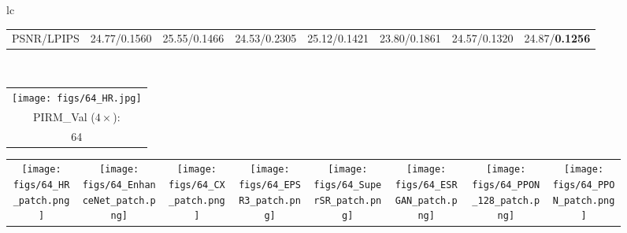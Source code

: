 \documentclass[preprint]{elsarticle}
\begin{document}
\begin{figure*}[htpb]
{\begin{tabular}{lc}
\begin{adjustbox}{valign=t}
\begin{tabular}{cccccccc}
					PSNR/LPIPS & \hspace{-3mm} 24.77/0.1560 & \hspace{-3mm} 25.55/0.1466 & \hspace{-3mm} 24.53/0.2305 &
					25.12/0.1421 & \hspace{-3mm} 23.80/0.1861 & \hspace{-3mm} 24.57/0.1320 & \hspace{-3mm} 24.87/\textbf{0.1256} \\
				\end{tabular}
			\end{adjustbox}
			\\
			\begin{adjustbox}{valign=t}
				\scriptsize
				\begin{tabular}{c}
					\texttt{[image: figs/64\_HR.jpg]} \\
					PIRM\_Val ($4 \times$): \\
					64 \\
				\end{tabular}
			\end{adjustbox}
			\hspace{-3mm}
			\begin{adjustbox}{valign=t}
				\scriptsize
				\begin{tabular}{cccccccc}
					\texttt{[image: figs/64\_HR\_patch.png]} &
					\hspace{-3mm}
					\texttt{[image: figs/64\_EnhanceNet\_patch.png]} &
					\hspace{-3mm}
					\texttt{[image: figs/64\_CX\_patch.png]} &
					\hspace{-3mm}
					\texttt{[image: figs/64\_EPSR3\_patch.png]} &
					\hspace{-3mm}					
					\texttt{[image: figs/64\_SuperSR\_patch.png]} &
					\hspace{-3mm}
					\texttt{[image: figs/64\_ESRGAN\_patch.png]} &
					\hspace{-3mm}
					\texttt{[image: figs/64\_PPON\_128\_patch.png]} &
					\hspace{-3mm}
					\texttt{[image: figs/64\_PPON\_patch.png]} \\
					

\end{tabular}
\end{adjustbox}
\end{tabular}}
\end{figure*}
\end{document}

